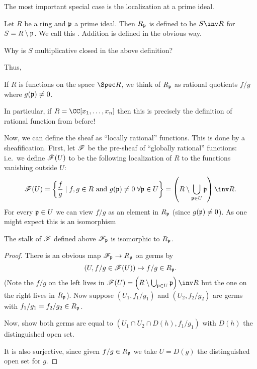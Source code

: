 The most important special case is the localization at a prime ideal.
\begin{definition}
	Let $R$ be a ring and $\mathfrak p$ a prime ideal.
	Then $R_\mathfrak p$ is defined to be $S\inv R$ for $S = R\setminus\mathfrak p$.
	We call this .
	Addition is defined in the obvious way.
\end{definition}
\begin{ques}
	Why is $S$ multiplicative closed in the above definition?
\end{ques}
Thus,
\begin{moral}
	If $R$ is functions on the space $\Spec R$,
	we think of $R_\mathfrak p$ as rational quotients $f/g$ where $g(\mathfrak p) \neq 0$.
\end{moral}
In particular, if $R = \CC[x_1, \dots, x_n]$
then this is precisely the definition of rational function from before!

Now, we can define the sheaf as ``locally rational'' functions.
This is done by a sheafification.
First, let $\mathscr F$ be the pre-sheaf of ``globally rational'' functions:
i.e.\ we define $\mathscr F(U)$ to be the following localization of $R$
to the functions vanishing outside $U$:
\[
	\SF(U) = \left\{ 
		\frac fg \mid f, g \in R
		\text{ and } g(\pp) \neq 0 \; \forall \pp \in U
	\right\}
	= \left(R \setminus \bigcup_{\pp \in U} \pp \right)\inv R.
\]
For every $\mathfrak p \in U$ we can view $f/g$ as an element in $R_\mathfrak p$
(since $g(\mathfrak p) \ne 0$).
As one might expect this is an isomorphism
\begin{lemma}
	\label{lem:global_rational_stalk}
	The stalk of $\mathscr F$ defined above $\mathscr F_\mathfrak p$ is isomorphic to $R_\mathfrak p$.
\end{lemma}
\begin{proof}
	There is an obvious map $\mathscr F_\mathfrak p \to R_\mathfrak p$ on germs by
	\[
		\left(U, f/g \in \mathscr F(U) \right)
		\mapsto f/g \in R_\mathfrak p . \]
	(Note the $f/g$ on the left lives in
	$\SF(U) = \left(R \setminus \bigcup_{\pp \in U} \pp \right)\inv R$
	but the one on the right lives in $R_\mathfrak p$).
	Now suppose $(U_1, f_1 / g_1)$ and $(U_2, f_2 / g_2)$
	are germs with $f_1/g_1 = f_2/g_2 \in R_\mathfrak p$.
	\begin{exercise}
		Now, show both germs are equal to $(U_1 \cap U_2 \cap D(h), f_1 / g_1)$
		with $D(h)$ the distinguished open set.
	\end{exercise}
	It is also surjective, since given $f/g \in R_\mathfrak p$ we take $U = D(g)$
	the distinguished open set for $g$.
\end{proof}


